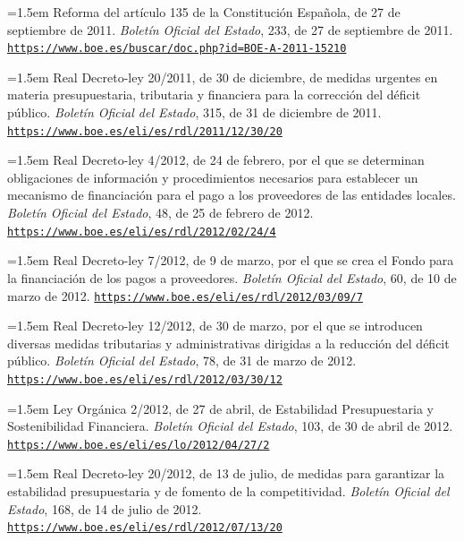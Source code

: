 \documentclass[10pt,a4paper]{article}
\begin{document}
\noindent\hangindent=1.5em Reforma del artículo 135 de la Constitución Española, de 27 de septiembre de 2011. \textit{Boletín Oficial del Estado}, 233, de 27 de septiembre de 2011. \href{https://www.boe.es/buscar/doc.php?id=BOE-A-2011-15210}{\nolinkurl{https://www.boe.es/buscar/doc.php?id=BOE-A-2011-15210}}

\noindent\hangindent=1.5em Real Decreto-ley 20/2011, de 30 de diciembre, de medidas urgentes en materia presupuestaria, tributaria y financiera para la corrección del déficit público. \textit{Boletín Oficial del Estado}, 315, de 31 de diciembre de 2011. \href{https://www.boe.es/eli/es/rdl/2011/12/30/20}{\nolinkurl{https://www.boe.es/eli/es/rdl/2011/12/30/20}}

\noindent\hangindent=1.5em Real Decreto-ley 4/2012, de 24 de febrero, por el que se determinan obligaciones de información y procedimientos necesarios para establecer un mecanismo de financiación para el pago a los proveedores de las entidades locales. \textit{Boletín Oficial del Estado}, 48, de 25 de febrero de 2012. \href{https://www.boe.es/eli/es/rdl/2012/02/24/4}{\nolinkurl{https://www.boe.es/eli/es/rdl/2012/02/24/4}}

\noindent\hangindent=1.5em Real Decreto-ley 7/2012, de 9 de marzo, por el que se crea el Fondo para la financiación de los pagos a proveedores. \textit{Boletín Oficial del Estado}, 60, de 10 de marzo de 2012. \href{https://www.boe.es/eli/es/rdl/2012/03/09/7}{\nolinkurl{https://www.boe.es/eli/es/rdl/2012/03/09/7}}

\noindent\hangindent=1.5em Real Decreto-ley 12/2012, de 30 de marzo, por el que se introducen diversas medidas tributarias y administrativas dirigidas a la reducción del déficit público. \textit{Boletín Oficial del Estado}, 78, de 31 de marzo de 2012. \href{https://www.boe.es/eli/es/rdl/2012/03/30/12}{\nolinkurl{https://www.boe.es/eli/es/rdl/2012/03/30/12}}

\noindent\hangindent=1.5em Ley Orgánica 2/2012, de 27 de abril, de Estabilidad Presupuestaria y Sostenibilidad Financiera. \textit{Boletín Oficial del Estado}, 103, de 30 de abril de 2012. \href{https://www.boe.es/eli/es/lo/2012/04/27/2}{\nolinkurl{https://www.boe.es/eli/es/lo/2012/04/27/2}}

\noindent\hangindent=1.5em Real Decreto-ley 20/2012, de 13 de julio, de medidas para garantizar la estabilidad presupuestaria y de fomento de la competitividad. \textit{Boletín Oficial del Estado}, 168, de 14 de julio de 2012. \href{https://www.boe.es/eli/es/rdl/2012/07/13/20}{\nolinkurl{https://www.boe.es/eli/es/rdl/2012/07/13/20}}
\end{document}
